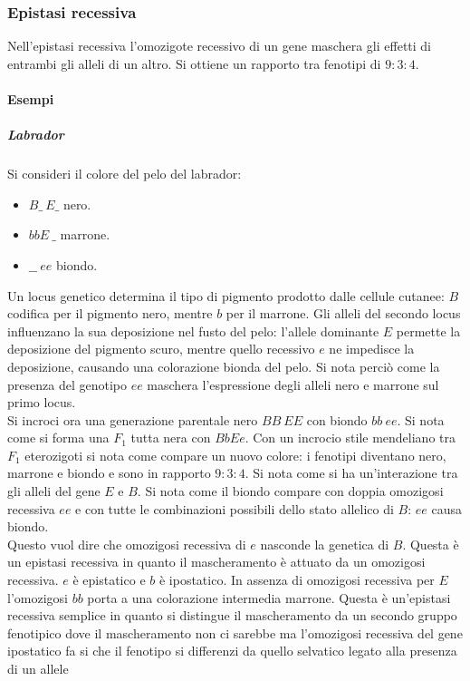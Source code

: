 \subsubsection{Epistasi recessiva}
Nell'epistasi recessiva l'omozigote recessivo di un gene maschera gli effetti di entrambi gli alleli di un altro. Si ottiene un rapporto tra fenotipi di $9:3:4$.
\paragraph{Esempi}
\subparagraph{Labrador}
Si consideri il colore del pelo del labrador: 
\begin{itemize}
	\item $B\_\ E\_$ nero.
	\item $bbE\ \_$ marrone.
	\item $\_\_\ ee$ biondo.
\end{itemize}
Un locus genetico determina il tipo di pigmento prodotto dalle cellule cutanee: $B$ codifica per il pigmento nero, mentre $b$ per il marrone. Gli alleli del secondo locus influenzano la sua deposizione nel
fusto del pelo: l'allele dominante $E$ permette la deposizione del pigmento scuro, mentre quello recessivo $e$ ne impedisce la deposizione, causando una colorazione bionda del pelo. Si nota perci\`o
come la presenza del genotipo $ee$ maschera l'espressione degli alleli nero e marrone sul primo locus. \\
Si incroci ora una generazione parentale nero $BB\ EE$ con biondo $bb\ ee$. Si nota come si forma una $F_1$ tutta nera con $BbEe$. Con un incrocio stile mendeliano tra $F_1$ eterozigoti
si nota come compare un nuovo colore: i fenotipi diventano nero, marrone e biondo e sono in rapporto $9:3:4$. Si nota come si ha un'interazione tra gli alleli del gene $E$ e $B$. Si nota come il biondo 
compare con doppia omozigosi recessiva $ee$ e con tutte le combinazioni possibili dello stato allelico di $B$: $ee$ causa biondo. \\
Questo vuol dire che omozigosi recessiva di $e$ nasconde la genetica di $B$. Questa \`e un epistasi recessiva in quanto il mascheramento \`e attuato da un omozigosi recessiva. $e$ \`e epistatico e $b$ \`e 
ipostatico. In assenza di omozigosi recessiva per $E$ l'omozigosi $bb$ porta a una colorazione intermedia marrone. Questa \`e un'epistasi recessiva semplice in quanto si distingue il mascheramento da un 
secondo gruppo fenotipico dove il mascheramento non ci sarebbe ma l'omozigosi recessiva del gene ipostatico fa si che il fenotipo si differenzi da quello selvatico legato alla presenza di un allele 
